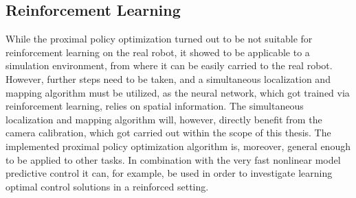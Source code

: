 \subsection{Reinforcement Learning}
While the proximal policy optimization turned out to be not suitable for reinforcement learning on the real robot, it showed to be applicable to a simulation environment, from where it can be easily carried to the real robot. However, further steps need to be taken, and a simultaneous localization and mapping algorithm must be utilized, as the neural network, which got trained via reinforcement learning, relies on spatial information. The simultaneous localization and mapping algorithm will, however, directly benefit from the camera calibration, which got carried out within the scope of this thesis. The implemented proximal policy optimization algorithm is, moreover, general enough to be applied to other tasks. In combination with the very fast nonlinear model predictive control it can, for example, be used in order to investigate learning optimal control solutions in a reinforced setting.